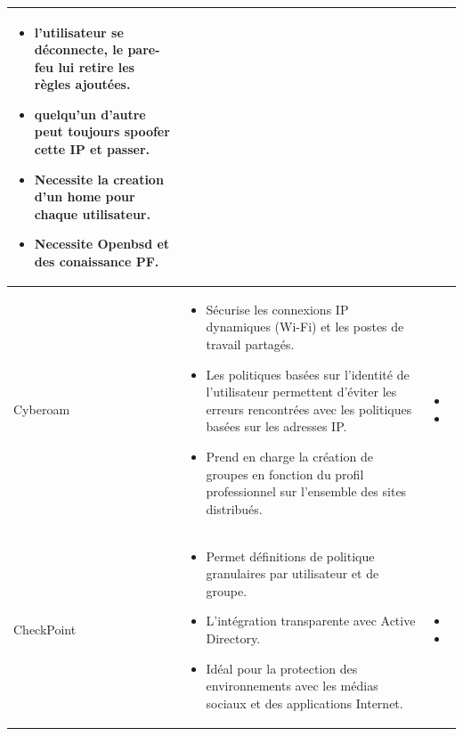 \documentclass[12pt]{report}
\begin{document}
\begin{itemize}
\begin{longtable}{|p{4cm}|p{6cm}|p{6cm}|}
\begin{itemize}
        \item l'utilisateur se déconnecte, le pare-feu lui retire les règles ajoutées.
        \item quelqu'un d'autre peut toujours spoofer cette IP et passer.
        \item Necessite la creation d'un home pour chaque utilisateur.
        \item Necessite Openbsd et des conaissance PF.
    \end{itemize} \\
  \hline
    Cyberoam&
    \begin{itemize}
        \item Sécurise les connexions IP dynamiques (Wi-Fi) et les postes de travail partagés.
        \item Les politiques basées sur l'identité de l'utilisateur permettent d'éviter les erreurs rencontrées avec les politiques basées sur les adresses IP.
        \item Prend en charge la création de groupes en fonction du profil professionnel sur l'ensemble des sites distribués.
    \end{itemize}&
    \begin{itemize}
        \item 
        \item 
    \end{itemize} \\
  \hline
    CheckPoint&
    \begin{itemize}
        \item Permet définitions de politique granulaires par utilisateur et de groupe.
        \item L'intégration transparente avec Active Directory.
        \item Idéal pour la protection des environnements avec les médias sociaux et des applications Internet.
    \end{itemize}&
    \begin{itemize}
        \item 
        \item 
    \end{itemize} \\
    \hline
\end{longtable}
\newligne


\end{itemize}
\end{document}
